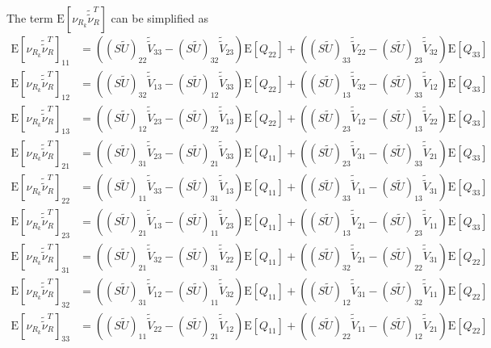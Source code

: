 \documentclass[10pt]{article}
\newcommand{\expect}[1]{\ensuremath{\mathrm{E}\left[ #1 \right]}}
\begin{document}
The term $\expect{\nu_{R_k}\tilde{\tilde{\nu}}_R^T}$ can be simplified as
\begin{align*}
	\expect{\nu_{R_k}\tilde{\tilde{\nu}}_R^T}_{11} &= 
	((S\tilde{U})_{22}\tilde{\tilde{V}}_{33} - (S\tilde{U})_{32}\tilde{\tilde{V}}_{23})\expect{Q_{22}} + ((S\tilde{U})_{33}\tilde{\tilde{V}}_{22} - (S\tilde{U})_{23}\tilde{\tilde{V}}_{32})\expect{Q_{33}} \\
	\expect{\nu_{R_k}\tilde{\tilde{\nu}}_R^T}_{12} &= 				  ((S\tilde{U})_{32}\tilde{\tilde{V}}_{13} -   (S\tilde{U})_{12}\tilde{\tilde{V}}_{33})\expect{Q_{22}} + ((S\tilde{U})_{13}\tilde{\tilde{V}}_{32} - (S\tilde{U})_{33}\tilde{\tilde{V}}_{12})\expect{Q_{33}} \\
	\expect{\nu_{R_k}\tilde{\tilde{\nu}}_R^T}_{13} &= ((S\tilde{U})_{12}\tilde{\tilde{V}}_{23} - (S\tilde{U})_{22}\tilde{\tilde{V}}_{13})\expect{Q_{22}} + ((S\tilde{U})_{23}\tilde{\tilde{V}}_{12} - (S\tilde{U})_{13}\tilde{\tilde{V}}_{22})\expect{Q_{33}} \\
	\expect{\nu_{R_k}\tilde{\tilde{\nu}}_R^T}_{21} &= ((S\tilde{U})_{31}\tilde{\tilde{V}}_{23} - (S\tilde{U})_{21}\tilde{\tilde{V}}_{33})\expect{Q_{11}} + ((S\tilde{U})_{23}\tilde{\tilde{V}}_{31} - (S\tilde{U})_{33}\tilde{\tilde{V}}_{21})\expect{Q_{33}} \\
	\expect{\nu_{R_k}\tilde{\tilde{\nu}}_R^T}_{22} &= ((S\tilde{U})_{11}\tilde{\tilde{V}}_{33} - (S\tilde{U})_{31}\tilde{\tilde{V}}_{13})\expect{Q_{11}} + ((S\tilde{U})_{33}\tilde{\tilde{V}}_{11} - (S\tilde{U})_{13}\tilde{\tilde{V}}_{31})\expect{Q_{33}} \\
	\expect{\nu_{R_k}\tilde{\tilde{\nu}}_R^T}_{23} &= ((S\tilde{U})_{21}\tilde{\tilde{V}}_{13} - (S\tilde{U})_{11}\tilde{\tilde{V}}_{23})\expect{Q_{11}} + ((S\tilde{U})_{13}\tilde{\tilde{V}}_{21} - (S\tilde{U})_{23}\tilde{\tilde{V}}_{11})\expect{Q_{33}} \\
	\expect{\nu_{R_k}\tilde{\tilde{\nu}}_R^T}_{31} &= ((S\tilde{U})_{21}\tilde{\tilde{V}}_{32} - (S\tilde{U})_{31}\tilde{\tilde{V}}_{22})\expect{Q_{11}} + ((S\tilde{U})_{32}\tilde{\tilde{V}}_{21} - (S\tilde{U})_{22}\tilde{\tilde{V}}_{31})\expect{Q_{22}} \\
	\expect{\nu_{R_k}\tilde{\tilde{\nu}}_R^T}_{32} &= ((S\tilde{U})_{31}\tilde{\tilde{V}}_{12} - (S\tilde{U})_{11}\tilde{\tilde{V}}_{32})\expect{Q_{11}} + ((S\tilde{U})_{12}\tilde{\tilde{V}}_{31} - (S\tilde{U})_{32}\tilde{\tilde{V}}_{11})\expect{Q_{22}} \\
	\expect{\nu_{R_k}\tilde{\tilde{\nu}}_R^T}_{33} &= ((S\tilde{U})_{11}\tilde{\tilde{V}}_{22} - (S\tilde{U})_{21}\tilde{\tilde{V}}_{12})\expect{Q_{11}} + ((S\tilde{U})_{22}\tilde{\tilde{V}}_{11} - (S\tilde{U})_{12}\tilde{\tilde{V}}_{21})\expect{Q_{22}}
\end{align*}
\end{document}

